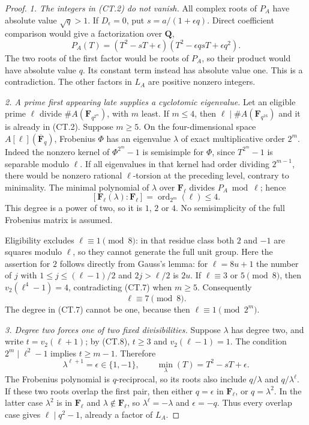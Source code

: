 \documentclass[11pt,a4paper]{article}
\begin{document}
\begin{proof}
\emph{1. The integers in (CT.2) do not vanish.}
All complex roots of $P_A$ have absolute value $\sqrt q>1$.
If $D_\epsilon=0$, put $s=a/(1+\epsilon q)$. Direct coefficient
comparison would give a factorization over $\mathbf Q$,
\[
 P_A(T)=(T^2-sT+\epsilon)
                 (T^2-\epsilon qsT+\epsilon q^2).
 \tag{CT.6}
\]
The two roots of the first factor would be roots of $P_A$,
so their product would have absolute value $q$. Its constant
term instead has absolute value one. This is a contradiction.
The other factors in $L_A$ are positive nonzero integers.

\emph{2. A prime first appearing late supplies a cyclotomic eigenvalue.}
Let an eligible prime $\ell$ divide $\#A(\mathbf F_{q^{2^m}})$,
with $m$ least. If $m\le4$, then
$\ell\mid\#A(\mathbf F_{q^{16}})$ and it is already in (CT.2).
Suppose $m\ge5$. On the four-dimensional space
$A[\ell](\overline{\mathbf F}_q)$, Frobenius $\Phi$ has an
eigenvalue $\lambda$ of exact multiplicative order $2^m$.
Indeed the nonzero kernel of $\Phi^{2^m}-1$ is semisimple for
$\Phi$, since $T^{2^m}-1$ is separable modulo $\ell$.
If all eigenvalues in that kernel had order dividing $2^{m-1}$,
there would be nonzero rational $\ell$-torsion at the preceding
level, contrary to minimality. The minimal polynomial of
$\lambda$ over $\mathbf F_\ell$ divides $P_A\bmod\ell$; hence
\[
       [\mathbf F_\ell(\lambda):\mathbf F_\ell]
               =\operatorname{ord}_{2^m}(\ell)\le4.
 \tag{CT.7}
\]
This degree is a power of two, so it is $1$, $2$ or $4$.
No semisimplicity of the full Frobenius matrix is assumed.

Eligibility excludes $\ell\equiv1\pmod8$: in that residue class
both $2$ and $-1$ are squares modulo $\ell$, so they cannot
generate the full unit group. Here the assertion for $2$ follows
directly from Gauss's lemma: for $\ell=8u+1$ the number of
$j$ with $1\le j\le(\ell-1)/2$ and $2j>\ell/2$ is $2u$.
If $\ell\equiv3$ or $5\pmod8$, then
$v_2(\ell^4-1)=4$, contradicting (CT.7) when $m\ge5$.
Consequently
\[
                              \ell\equiv7\pmod8.
 \tag{CT.8}
\]
The degree in (CT.7) cannot be one, because then
$\ell\equiv1\pmod{2^m}$.

\emph{3. Degree two forces one of two fixed divisibilities.}
Suppose $\lambda$ has degree two, and write
$t=v_2(\ell+1)$; by (CT.8), $t\ge3$ and $v_2(\ell-1)=1$.
The condition $2^m\mid\ell^2-1$ implies $t\ge m-1$.
Therefore
\[
          \lambda^{\ell+1}=\epsilon\in\{1,-1\},
       \qquad
          \operatorname{min}_\lambda(T)=T^2-sT+\epsilon.
 \tag{CT.9}
\]
The Frobenius polynomial is $q$-reciprocal, so its roots also
include $q/\lambda$ and $q/\lambda^\ell$. If these two roots
overlap the first pair, then either $q=\epsilon$ in
$\mathbf F_\ell$, or $q=\lambda^2$.
In the latter case $\lambda^2$ is in $\mathbf F_\ell$ and
$\lambda\notin\mathbf F_\ell$, so
$\lambda^\ell=-\lambda$ and $\epsilon=-q$.
Thus every overlap case gives $\ell\mid q^2-1$, already a factor
of $L_A$.


\end{proof}
\end{document}
